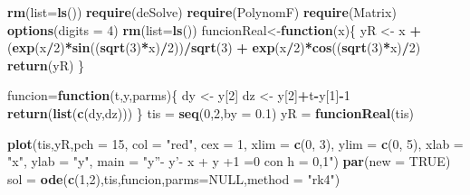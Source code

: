 \documentclass[]{article}
\newenvironment{Shaded}{\begin{snugshade}}{\end{snugshade}}
\newcommand{\KeywordTok}[1]{\textcolor[rgb]{0.13,0.29,0.53}{\textbf{#1}}}
\newcommand{\DataTypeTok}[1]{\textcolor[rgb]{0.13,0.29,0.53}{#1}}
\newcommand{\DecValTok}[1]{\textcolor[rgb]{0.00,0.00,0.81}{#1}}
\newcommand{\FloatTok}[1]{\textcolor[rgb]{0.00,0.00,0.81}{#1}}
\newcommand{\StringTok}[1]{\textcolor[rgb]{0.31,0.60,0.02}{#1}}
\newcommand{\OtherTok}[1]{\textcolor[rgb]{0.56,0.35,0.01}{#1}}
\newcommand{\ControlFlowTok}[1]{\textcolor[rgb]{0.13,0.29,0.53}{\textbf{#1}}}
\newcommand{\OperatorTok}[1]{\textcolor[rgb]{0.81,0.36,0.00}{\textbf{#1}}}
\newcommand{\NormalTok}[1]{#1}
\begin{document}
\begin{Shaded}
\begin{Highlighting}[]
\KeywordTok{rm}\NormalTok{(}\DataTypeTok{list=}\KeywordTok{ls}\NormalTok{())}
\KeywordTok{require}\NormalTok{(deSolve)}
\KeywordTok{require}\NormalTok{(PolynomF)}
\KeywordTok{require}\NormalTok{(Matrix)}
\KeywordTok{options}\NormalTok{(}\DataTypeTok{digits =} \DecValTok{4}\NormalTok{)}
\KeywordTok{rm}\NormalTok{(}\DataTypeTok{list=}\KeywordTok{ls}\NormalTok{())}
\NormalTok{funcionReal<-}\ControlFlowTok{function}\NormalTok{(x)\{}
\NormalTok{  yR <-}\StringTok{ }\NormalTok{x }\OperatorTok{+}\StringTok{ }\NormalTok{(}\KeywordTok{exp}\NormalTok{(x}\OperatorTok{/}\DecValTok{2}\NormalTok{)}\OperatorTok{*}\KeywordTok{sin}\NormalTok{((}\KeywordTok{sqrt}\NormalTok{(}\DecValTok{3}\NormalTok{)}\OperatorTok{*}\NormalTok{x)}\OperatorTok{/}\DecValTok{2}\NormalTok{))}\OperatorTok{/}\KeywordTok{sqrt}\NormalTok{(}\DecValTok{3}\NormalTok{) }\OperatorTok{+}\StringTok{ }\KeywordTok{exp}\NormalTok{(x}\OperatorTok{/}\DecValTok{2}\NormalTok{)}\OperatorTok{*}\KeywordTok{cos}\NormalTok{((}\KeywordTok{sqrt}\NormalTok{(}\DecValTok{3}\NormalTok{)}\OperatorTok{*}\NormalTok{x)}\OperatorTok{/}\DecValTok{2}\NormalTok{) }
  \KeywordTok{return}\NormalTok{(yR)}
\NormalTok{\}}

\NormalTok{funcion=}\ControlFlowTok{function}\NormalTok{(t,y,parms)\{}
\NormalTok{  dy <-}\StringTok{ }\NormalTok{y[}\DecValTok{2}\NormalTok{]}
\NormalTok{  dz <-}\StringTok{ }\NormalTok{y[}\DecValTok{2}\NormalTok{]}\OperatorTok{+}\NormalTok{t}\OperatorTok{-}\NormalTok{y[}\DecValTok{1}\NormalTok{]}\OperatorTok{-}\DecValTok{1}
  \KeywordTok{return}\NormalTok{(}\KeywordTok{list}\NormalTok{(}\KeywordTok{c}\NormalTok{(dy,dz)))}
\NormalTok{\}}
\NormalTok{tis =}\StringTok{ }\KeywordTok{seq}\NormalTok{(}\DecValTok{0}\NormalTok{,}\DecValTok{2}\NormalTok{,}\DataTypeTok{by =} \FloatTok{0.1}\NormalTok{)}
\NormalTok{yR =}\StringTok{ }\KeywordTok{funcionReal}\NormalTok{(tis)}

\KeywordTok{plot}\NormalTok{(tis,yR,}\DataTypeTok{pch =} \DecValTok{15}\NormalTok{, }\DataTypeTok{col =} \StringTok{"red"}\NormalTok{, }\DataTypeTok{cex =} \DecValTok{1}\NormalTok{, }\DataTypeTok{xlim =} \KeywordTok{c}\NormalTok{(}\DecValTok{0}\NormalTok{, }\DecValTok{3}\NormalTok{), }\DataTypeTok{ylim =} \KeywordTok{c}\NormalTok{(}\DecValTok{0}\NormalTok{, }\DecValTok{5}\NormalTok{), }\DataTypeTok{xlab =} \StringTok{"x"}\NormalTok{, }\DataTypeTok{ylab =} \StringTok{"y"}\NormalTok{, }\DataTypeTok{main =} \StringTok{"y''- y'- x + y +1 =0 con h = 0,1"}\NormalTok{)}
\KeywordTok{par}\NormalTok{(}\DataTypeTok{new =} \OtherTok{TRUE}\NormalTok{)}
\NormalTok{sol =}\StringTok{ }\KeywordTok{ode}\NormalTok{(}\KeywordTok{c}\NormalTok{(}\DecValTok{1}\NormalTok{,}\DecValTok{2}\NormalTok{),tis,funcion,}\DataTypeTok{parms=}\OtherTok{NULL}\NormalTok{,}\DataTypeTok{method =} \StringTok{"rk4"}\NormalTok{)}


\end{Highlighting}
\end{Shaded}
\end{document}
